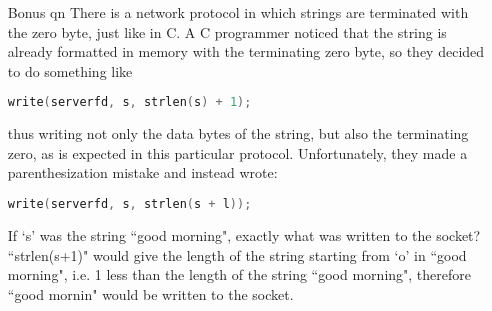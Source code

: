 \documentclass[11pt]{article}
\begin{document}
\begin{enumerate}
		\newpage
		\item[Bonus qn]
		There is a network protocol in which strings are terminated with the zero byte, just like in C. A C programmer noticed that the string is already formatted in memory with the terminating zero byte, so they decided to do something like
		\begin{lstlisting}[language=c]
	write(serverfd, s, strlen(s) + 1);\end{lstlisting}
		thus writing not only the data bytes of the string, but also the terminating zero, as is expected in this particular protocol.
		Unfortunately, they made a parenthesization mistake and instead wrote: \begin{lstlisting}[language=c]
	write(serverfd, s, strlen(s + l));\end{lstlisting}
		If `s' was the string ``good morning", exactly what was written to the socket?\\

			``strlen(s+1)" would give the length of the string starting from `o' in ``good morning", i.e. 1 less than the length of the string ``good morning", therefore ``good mornin" would be written to the socket.
	\end{enumerate}
\end{document}
